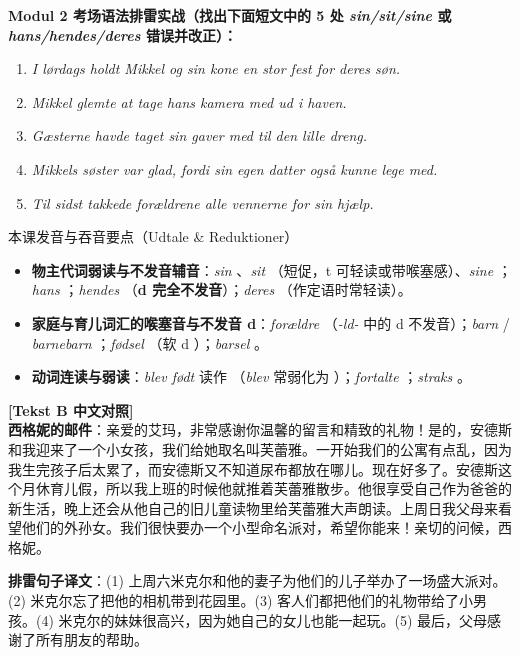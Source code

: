 \textbf{Modul 2 考场语法排雷实战（找出下面短文中的 5 处 \textit{sin/sit/sine} 或 \textit{hans/hendes/deres} 错误并改正）：}
\begin{enumerate}
  \item[(1)] \textit{I lørdags holdt Mikkel og sin kone en stor fest for deres søn.}
  \item[(2)] \textit{Mikkel glemte at tage hans kamera med ud i haven.}
  \item[(3)] \textit{Gæsterne havde taget sin gaver med til den lille dreng.}
  \item[(4)] \textit{Mikkels søster var glad, fordi sin egen datter også kunne lege med.}
  \item[(5)] \textit{Til sidst takkede forældrene alle vennerne for sin hjælp.}
\end{enumerate}

\begin{tipbox}{本课发音与吞音要点（Udtale \& Reduktioner）}
\begin{itemize}
  \item \textbf{物主代词弱读与不发音辅音}：\textit{sin} 、\textit{sit} （短促，t 可轻读或带喉塞感）、\textit{sine} ；\textit{hans} ；\textit{hendes} （\textbf{d 完全不发音}）；\textit{deres} （作定语时常轻读）。
  \item \textbf{家庭与育儿词汇的喉塞音与不发音 d}：\textit{forældre} （\textit{-ld-} 中的 d 不发音）；\textit{barn}  / \textit{barnebarn} ；\textit{fødsel} （软 d ）；\textit{barsel} 。
  \item \textbf{动词连读与弱读}：\textit{blev født} 读作 （\textit{blev} 常弱化为 ）；\textit{fortalte} ；\textit{straks} 。
\end{itemize}
\end{tipbox}

\begin{transbox}
\small
\textbf{\color{NCDTeal}[Tekst B 中文对照]}\\
\textbf{西格妮的邮件}：亲爱的艾玛，非常感谢你温馨的留言和精致的礼物！是的，安德斯和我迎来了一个小女孩，我们给她取名叫芙蕾雅。一开始我们的公寓有点乱，因为我生完孩子后太累了，而安德斯又不知道尿布都放在哪儿。现在好多了。安德斯这个月休育儿假，所以我上班的时候他就推着芙蕾雅散步。他很享受自己作为爸爸的新生活，晚上还会从他自己的旧儿童读物里给芙蕾雅大声朗读。上周日我父母来看望他们的外孙女。我们很快要办一个小型命名派对，希望你能来！亲切的问候，西格妮。

\textbf{排雷句子译文}：(1) 上周六米克尔和他的妻子为他们的儿子举办了一场盛大派对。(2) 米克尔忘了把他的相机带到花园里。(3) 客人们都把他们的礼物带给了小男孩。(4) 米克尔的妹妹很高兴，因为她自己的女儿也能一起玩。(5) 最后，父母感谢了所有朋友的帮助。
\end{transbox}


